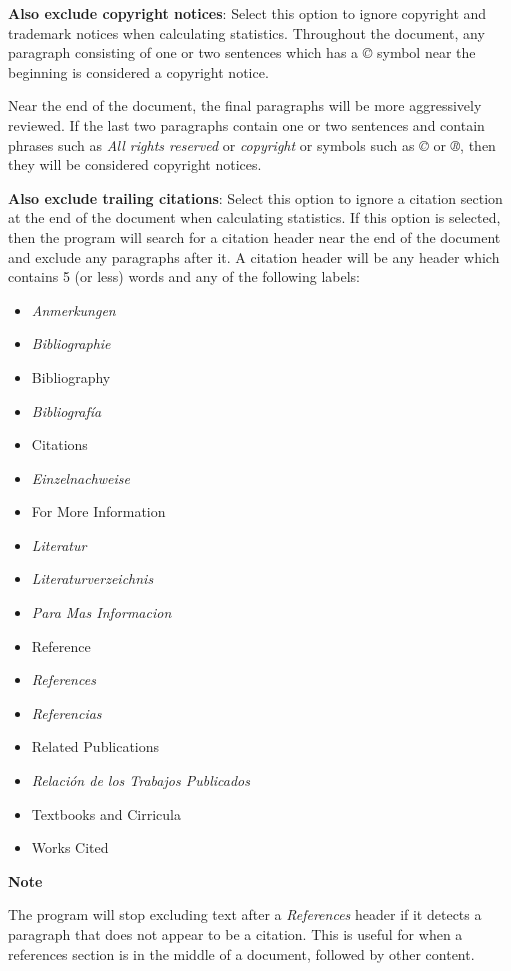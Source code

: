 \documentclass[
]{book}
\providecommand{\tightlist}{%
  \setlength{\itemsep}{0pt}\setlength{\parskip}{0pt}}
\newenvironment{notesection}
    {
    \begin{tcolorbox}[colframe=mediumblue,colback=lightblue,coltext=mediumblue,arc=3mm]
    \faLightbulb[regular] \textbf{Note} \newline
    }
    {
    \end{tcolorbox}
    }
\theoremstyle{definition}
\theoremstyle{definition}
\theoremstyle{definition}
\theoremstyle{definition}
\theoremstyle{remark}
\begin{document}
\textbf{Also exclude copyright notices}: Select this option to ignore copyright and trademark notices when calculating statistics. Throughout the document, any paragraph consisting of one or two sentences which has a \emph{©} symbol near the beginning is considered a copyright notice.

Near the end of the document, the final paragraphs will be more aggressively reviewed. If the last two paragraphs contain one or two sentences and contain phrases such as \emph{All rights reserved} or \emph{copyright} or symbols such as \emph{©} or \emph{®}, then they will be considered copyright notices.

\textbf{Also exclude trailing citations}: Select this option to ignore a citation section at the end of the document when calculating statistics. If this option is selected, then the program will search for a citation header near the end of the document and exclude any paragraphs after it. A citation header will be any header which contains 5 (or less) words and any of the following labels:

\begin{itemize}
\tightlist
\item
  \emph{Anmerkungen}
\item
  \emph{Bibliographie}
\item
  Bibliography
\item
  \emph{Bibliografía}
\item
  Citations
\item
  \emph{Einzelnachweise}
\item
  For More Information
\item
  \emph{Literatur}
\item
  \emph{Literaturverzeichnis}
\item
  \emph{Para Mas Informacion}
\item
  Reference
\item
  \emph{References}
\item
  \emph{Referencias}
\item
  Related Publications
\item
  \emph{Relación de los Trabajos Publicados}
\item
  Textbooks and Cirricula
\item
  Works Cited
\end{itemize}

\begin{notesection}
The program will stop excluding text after a \emph{References} header if it detects a paragraph that does not appear to be a citation. This is useful for when a references section is in the middle of a document, followed by other content.

\end{notesection}
\end{document}
